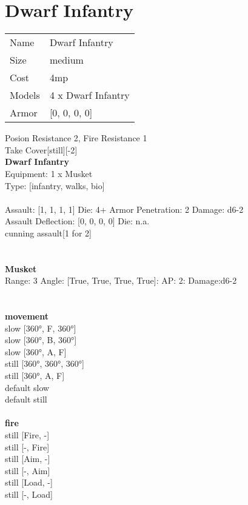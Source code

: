 \pagebreak

\section{ Dwarf Infantry }

\begin{tabular}{ll}
  Name & Dwarf Infantry \\
  Size & medium\\
  Cost & 4mp\\
  Models & 4 x Dwarf Infantry\\
  Armor & [0, 0, 0, 0]\\
\end{tabular}

\noindent Posion Resistance 2, Fire Resistance 1\\ 
Take Cover[still][-2]\\ 


{\bf Dwarf Infantry } \\
Equipment: 1 x Musket \\
Type: [infantry, walks, bio] \\
\ \\
Assault: [1, 1, 1, 1] Die: 4+ Armor Penetration: 2 Damage: d6-2 \\
Assault Deflection: [0, 0, 0, 0] Die: n.a.\\
\indent cunning assault[1 for 2]\\ 
 
\ \\

\ \\
{\bf Musket } \\



Range: 3  Angle: [True, True, True, True]: AP: 2: Damage:d6-2 \\




 
\ \\




\ \\ {\bf movement } \\
slow [360°, F, 360°] \\
slow [360°, B, 360°] \\
slow [360°, A, F] \\
still [360°, 360°, 360°] \\
still [360°, A, F] \\
default slow \\
default still \\
\ \\ {\bf fire } \\
still [Fire, -] \\
still [-, Fire] \\
still [Aim, -] \\
still [-, Aim] \\
still [Load, -] \\
still [-, Load] \\


